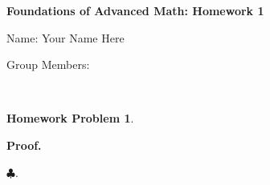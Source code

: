 \documentclass{article}
\newtheorem{hw}{Homework Problem}
\begin{document}
 
	\Large \begin{center} {\bf Foundations of Advanced Math: Homework 1}  \end{center}

	\noindent Name: \hspace{2.5 in} Your Name Here %

	\noindent  Group Members:

	\underline{\hspace{5in}}

	\normalsize


	\

	\begin{hw}
	\end{hw}

		{\bf Proof.} %

	\hfill $\clubsuit$. %
\end{document}
